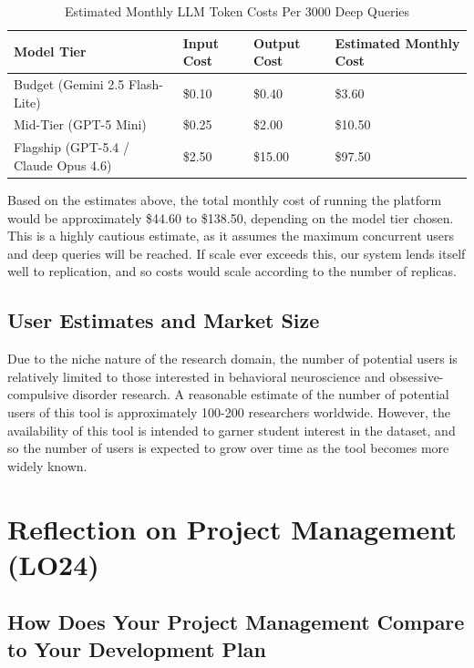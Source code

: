 \documentclass{article}
\begin{document}
\begin{table}[H]
\centering
\caption{Estimated Monthly LLM Token Costs Per 3000 Deep Queries}
\label{tab:LLMCosts}
\begin{tabularx}{\textwidth}{>{\hsize=2.2\hsize}X >{\raggedleft\arraybackslash\hsize=0.6\hsize}X >{\raggedleft\arraybackslash\hsize=0.6\hsize}X >{\raggedleft\arraybackslash\hsize=0.6\hsize}X}
\toprule
\textbf{Model Tier} & \textbf{Input Cost} & \textbf{Output Cost} & \textbf{Estimated Monthly Cost} \\
\midrule
Budget (Gemini 2.5 Flash-Lite) & \$0.10 & \$0.40 & \$3.60 \\
Mid-Tier (GPT-5 Mini) & \$0.25 & \$2.00 & \$10.50 \\
Flagship (GPT-5.4 / Claude Opus 4.6) & \$2.50 & \$15.00 & \$97.50 \\
\bottomrule
\end{tabularx}
\end{table}

Based on the estimates above, the total monthly cost of running the platform would be approximately \$44.60 to \$138.50, depending on the model tier chosen. This is a highly cautious estimate, as it assumes the maximum concurrent users and deep queries will be reached. If scale ever exceeds this, our system lends itself well to replication, and so costs would scale according to the number of replicas. 

\subsection{User Estimates and Market Size}

Due to the niche nature of the research domain, the number of potential users is relatively limited to those interested in behavioral neuroscience and obsessive-compulsive disorder research. A reasonable estimate of the number of potential users of this tool is approximately 100-200 researchers worldwide. However, the availability of this tool is intended to garner student interest in the dataset, and so the number of users is expected to grow over time as the tool becomes more widely known. 

\section{Reflection on Project Management (LO24)}


\subsection{How Does Your Project Management Compare to Your Development Plan}
\end{document}
